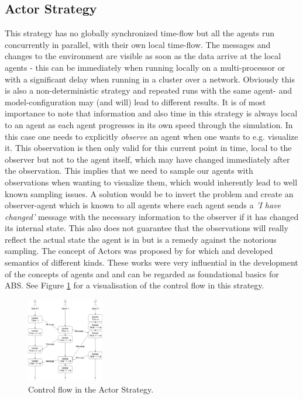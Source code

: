 \subsection{Actor Strategy}
This strategy has no globally synchronized time-flow but all the agents run concurrently in parallel, with their own local time-flow. The messages and changes to the environment are visible as soon as the data arrive at the local agents - this can be immediately when running locally on a multi-processor or with a significant delay when running in a cluster over a network. Obviously this is also a non-deterministic strategy and repeated runs with the same agent- and model-configuration may (and will) lead to different results. It is of most importance to note that information and also time in this strategy is always local to an agent as each agent progresses in its own speed through the simulation. In this case one needs to explicitly \textit{observe} an agent when one wants to e.g. visualize it. This observation is then only valid for this current point in time, local to the observer but not to the agent itself, which may have changed immediately after the observation. This implies that we need to sample our agents with observations when wanting to visualize them, which would inherently lead to well known sampling issues. A solution would be to invert the problem and create an observer-agent which is known to all agents where each agent sends a \textit{'I have changed'} message with the necessary information to the observer if it has changed its internal state. This also does not guarantee that the observations will really reflect the actual state the agent is in but is a remedy against the notorious sampling. The concept of Actors was proposed by \cite{hewitt_universal_1973} for which \cite{greif_semantics_1975} and \cite{clinger_foundations_1981} developed semantics of different kinds. These works were very influential in the development of the concepts of agents and and can be regarded as foundational basics for ABS.  See Figure \ref{fig:strategy_act} for a visualisation of the control flow in this strategy.

\begin{figure}[H]
	\centering
	\includegraphics[width=0.3\textwidth, angle=0]{./fig/fpabs/timedriven/actor.png}
	\caption{Control flow in the Actor Strategy.}
	\label{fig:strategy_act}
\end{figure}